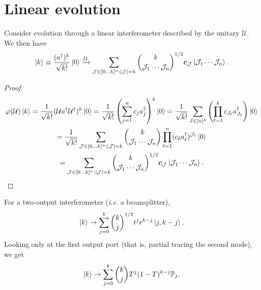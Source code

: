 \documentclass[a4paper]{report}
\newcommand{\PP}{\mathbb{P}}
\newcommand{\bs}[1]{\boldsymbol{#1}}
\newcommand{\calJ}{{\mathcal{J}}}
\newcommand{\calU}{{\mathcal{U}}}
\begin{document}
\section{Linear evolution}

\begin{prop}
	Consider evolution through a linear interferometer described by the unitary $\calU$. We then have
	\begin{equation}
		\ket k \equiv \frac{(a^\dagger)^k}{\sqrt{k!}} \ket 0
		\xrightarrow{\calU} \sum_{\calJ\in[0...k]^n : |\calJ|=k}
		\binom{k}{\calJ_1\cdots \calJ_n}^{1/2}
		\bs c_{\calJ}
		\ket{\calJ_1\cdots \calJ_n}.
	\end{equation}
\end{prop}

\begin{proof}
	\begin{equation}
	\begin{gathered}
		\varphi(\calU) \ket k
		= \frac{1}{\sqrt{k!}}(\calU a^\dagger \calU^\dagger)^k \ket0
		= \frac{1}{\sqrt{k!}}
		\left(
			\sum_{j=1}^n c_j a_j^\dagger
		\right)^k \ket 0
		= \frac{1}{\sqrt{k!}}
		\sum_{J\in [n]^k} \left(\prod_{\ell=1}^k c_{J_\ell} a_{J_\ell}^\dagger\right) \ket0 \\
		= \frac{1}{\sqrt{k!}}
		\sum_{\calJ\in[0...k]^n : |\calJ|=k}
		\binom{k}{\calJ_1\cdots \calJ_n}
		\prod_{\ell=1}^n (c_\ell a_{\ell}^\dagger)^{\calJ_\ell} \ket0 \\
		= \sum_{\calJ\in[0...k]^n : |\calJ|=k}
		\binom{k}{\calJ_1\cdots \calJ_n}^{1/2}
		\bs c_\calJ \ket{\calJ_1\cdots \calJ_n}.
	\end{gathered}
	\end{equation}
\end{proof}

\begin{example}
	For a two-output interferometer (\emph{i.e.} a beamsplitter),
	\begin{equation}
		\ket k \to
		\sum_{j=0}^k \binom{k}{j}^{1/2} t^j r^{k-j} \ket{j,k-j}.
	\end{equation}
	Looking only at the first output port (that is, partial tracing the second mode), we get
	\begin{equation}
		\ket k \to
		\sum_{j=0}^k \binom{k}{j} T^j (1-T)^{k-j} \PP_j.
	\end{equation}
\end{example}
\end{document}
